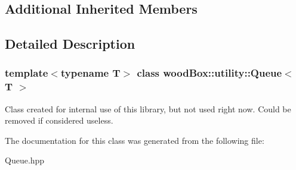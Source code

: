 \subsection*{Additional Inherited Members}


\subsection{Detailed Description}
\subsubsection*{template$<$typename T$>$\newline
class wood\+Box\+::utility\+::\+Queue$<$ T $>$}

Class created for internal use of this library, but not used right now. Could be removed if considered useless. 

The documentation for this class was generated from the following file\+:\begin{DoxyCompactItemize}
\item 
Queue.\+hpp\end{DoxyCompactItemize}
